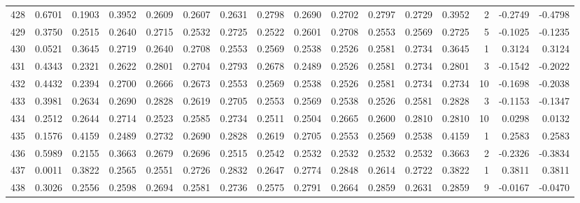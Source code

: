 \begin{tabular}{lrrrrrrrrrrrrrrr}
428 &      0.6701 &  0.1903 &  0.3952 &  0.2609 &  0.2607 &  0.2631 &  0.2798 &  0.2690 &  0.2702 &  0.2797 &   0.2729 &     0.3952 &      2 &                   -0.2749 &                    -0.4798 \\
429 &      0.3750 &  0.2515 &  0.2640 &  0.2715 &  0.2532 &  0.2725 &  0.2522 &  0.2601 &  0.2708 &  0.2553 &   0.2569 &     0.2725 &      5 &                   -0.1025 &                    -0.1235 \\
430 &      0.0521 &  0.3645 &  0.2719 &  0.2640 &  0.2708 &  0.2553 &  0.2569 &  0.2538 &  0.2526 &  0.2581 &   0.2734 &     0.3645 &      1 &                    0.3124 &                     0.3124 \\
431 &      0.4343 &  0.2321 &  0.2622 &  0.2801 &  0.2704 &  0.2793 &  0.2678 &  0.2489 &  0.2526 &  0.2581 &   0.2734 &     0.2801 &      3 &                   -0.1542 &                    -0.2022 \\
432 &      0.4432 &  0.2394 &  0.2700 &  0.2666 &  0.2673 &  0.2553 &  0.2569 &  0.2538 &  0.2526 &  0.2581 &   0.2734 &     0.2734 &     10 &                   -0.1698 &                    -0.2038 \\
433 &      0.3981 &  0.2634 &  0.2690 &  0.2828 &  0.2619 &  0.2705 &  0.2553 &  0.2569 &  0.2538 &  0.2526 &   0.2581 &     0.2828 &      3 &                   -0.1153 &                    -0.1347 \\
434 &      0.2512 &  0.2644 &  0.2714 &  0.2523 &  0.2585 &  0.2734 &  0.2511 &  0.2504 &  0.2665 &  0.2600 &   0.2810 &     0.2810 &     10 &                    0.0298 &                     0.0132 \\
435 &      0.1576 &  0.4159 &  0.2489 &  0.2732 &  0.2690 &  0.2828 &  0.2619 &  0.2705 &  0.2553 &  0.2569 &   0.2538 &     0.4159 &      1 &                    0.2583 &                     0.2583 \\
436 &      0.5989 &  0.2155 &  0.3663 &  0.2679 &  0.2696 &  0.2515 &  0.2542 &  0.2532 &  0.2532 &  0.2532 &   0.2532 &     0.3663 &      2 &                   -0.2326 &                    -0.3834 \\
437 &      0.0011 &  0.3822 &  0.2565 &  0.2551 &  0.2726 &  0.2832 &  0.2647 &  0.2774 &  0.2848 &  0.2614 &   0.2722 &     0.3822 &      1 &                    0.3811 &                     0.3811 \\
438 &      0.3026 &  0.2556 &  0.2598 &  0.2694 &  0.2581 &  0.2736 &  0.2575 &  0.2791 &  0.2664 &  0.2859 &   0.2631 &     0.2859 &      9 &                   -0.0167 &                    -0.0470 \\

\end{tabular}
